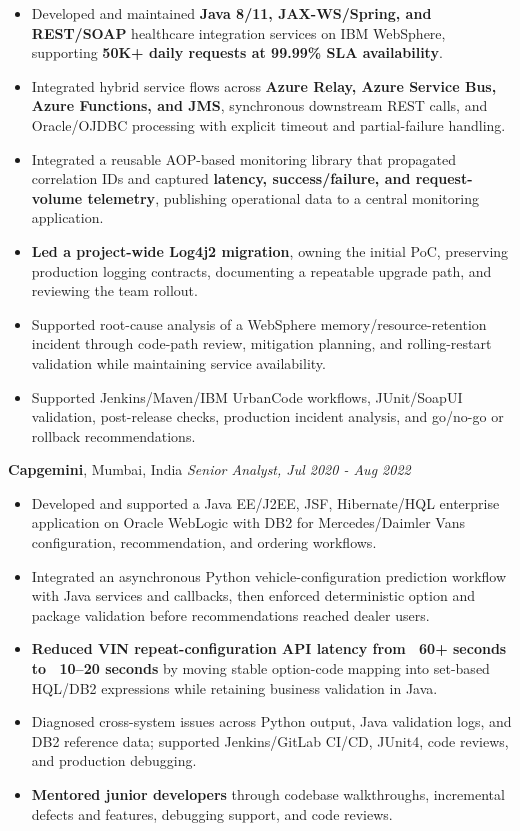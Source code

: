 \documentclass[11pt,letterpaper]{article}
\begin{document}
\begin{itemize}
  \item Developed and maintained \textbf{Java 8/11, JAX-WS/Spring, and REST/SOAP} healthcare integration services on IBM WebSphere, supporting \textbf{50K+ daily requests at 99.99\% SLA availability}.
  \item Integrated hybrid service flows across \textbf{Azure Relay, Azure Service Bus, Azure Functions, and JMS}, synchronous downstream REST calls, and Oracle/OJDBC processing with explicit timeout and partial-failure handling.
  \item Integrated a reusable AOP-based monitoring library that propagated correlation IDs and captured \textbf{latency, success/failure, and request-volume telemetry}, publishing operational data to a central monitoring application.
  \item \textbf{Led a project-wide Log4j2 migration}, owning the initial PoC, preserving production logging contracts, documenting a repeatable upgrade path, and reviewing the team rollout.
  \item Supported root-cause analysis of a WebSphere memory/resource-retention incident through code-path review, mitigation planning, and rolling-restart validation while maintaining service availability.
  \item Supported Jenkins/Maven/IBM UrbanCode workflows, JUnit/SoapUI validation, post-release checks, production incident analysis, and go/no-go or rollback recommendations.
\end{itemize}
\textbf{Capgemini}, Mumbai, India \hfill \textit{Senior Analyst, Jul 2020 - Aug 2022}
\begin{itemize}
  \item Developed and supported a Java EE/J2EE, JSF, Hibernate/HQL enterprise application on Oracle WebLogic with DB2 for Mercedes/Daimler Vans configuration, recommendation, and ordering workflows.
  \item Integrated an asynchronous Python vehicle-configuration prediction workflow with Java services and callbacks, then enforced deterministic option and package validation before recommendations reached dealer users.
  \item \textbf{Reduced VIN repeat-configuration API latency from ~60+ seconds to ~10--20 seconds} by moving stable option-code mapping into set-based HQL/DB2 expressions while retaining business validation in Java.
  \item Diagnosed cross-system issues across Python output, Java validation logs, and DB2 reference data; supported Jenkins/GitLab CI/CD, JUnit4, code reviews, and production debugging.
  \item \textbf{Mentored junior developers} through codebase walkthroughs, incremental defects and features, debugging support, and code reviews.
\end{itemize}
\end{document}
